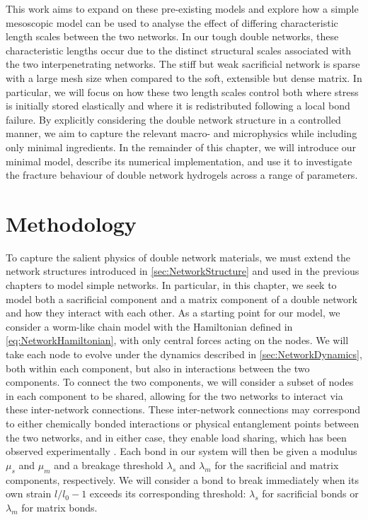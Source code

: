 \documentclass[asymmetricmargins]{library/duthesis}%
\begin{document}
This work aims to expand on these pre-existing models and explore how a simple mesoscopic model can be used to analyse the effect of differing characteristic length scales between the two networks. In our tough double networks, these characteristic lengths occur due to the distinct structural scales associated with the two interpenetrating networks. The stiff but weak sacrificial network is sparse with a large mesh size when compared to the soft, extensible but dense matrix. In particular, we will focus on how these two length scales control both where stress is initially stored elastically and where it is redistributed following a local bond failure. By explicitly considering the double network structure in a controlled manner, we aim to capture the relevant macro- and microphysics while including only minimal ingredients. In the remainder of this chapter, we will introduce our minimal model, describe its numerical implementation, and use it to investigate the fracture behaviour of double network hydrogels across a range of parameters.

\section{Methodology}
To capture the salient physics of double network materials, we must extend the network structures introduced in \cref{sec:NetworkStructure} and used in the previous chapters to model simple networks. In particular, in this chapter, we seek to model both a sacrificial component and a matrix component of a double network and how they interact with each other. As a starting point for our model, we consider a worm-like chain model with the Hamiltonian defined in \cref{eq:NetworkHamiltonian}, with only central forces acting on the nodes. We will take each node to evolve under the dynamics described in \cref{sec:NetworkDynamics}, both within each component, but also in interactions between the two components. To connect the two components, we will consider a subset of nodes in each component to be shared, allowing for the two networks to interact via these inter-network connections. These inter-network connections may correspond to either chemically bonded interactions or physical entanglement points between the two networks, and in either case, they enable load sharing, which has been observed experimentally \cite{ahmedBrittleDuctileTransition2014}. Each bond in our system will then be given a modulus $\mu_s$ and $\mu_m$ and a breakage threshold $\lambda_s$ and $\lambda_m$ for the sacrificial and matrix components, respectively. We will consider a bond to break immediately when its own strain $l/l_0 - 1$ exceeds its corresponding threshold: $\lambda_s$ for sacrificial bonds or $\lambda_m$ for matrix bonds.
\end{document}
